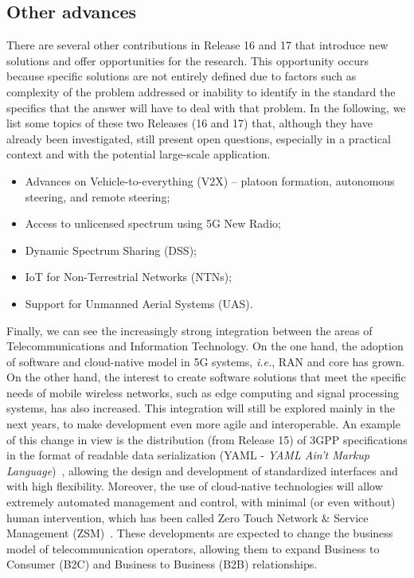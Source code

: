 \subsection*{Other advances}

There are several other contributions in Release 16 and 17 that introduce new solutions and offer opportunities for the research. This opportunity occurs because specific solutions are not entirely defined due to factors such as complexity of the problem addressed or inability to identify in the standard the specifics that the answer will have to deal with that problem. In the following, we list some topics of these two Releases (16 and 17) that, although they have already been investigated, still present open questions, especially in a practical context and with the potential large-scale application. 

\begin{itemize}
    \item Advances on Vehicle-to-everything (V2X) -- platoon formation, autonomous steering, and remote steering;
    \item Access to unlicensed spectrum using 5G New Radio; 
    \item Dynamic Spectrum Sharing (DSS);
    \item IoT for Non-Terrestrial Networks (NTNs);
    \item Support for Unmanned Aerial Systems (UAS).
\end{itemize}

Finally, we can see the increasingly strong integration between the areas of Telecommunications and Information Technology. On the one hand, the adoption of software and cloud-native model in 5G systems, \textit{i.e.}, RAN and core has grown. On the other hand, the interest to create software solutions that meet the specific needs of mobile wireless networks, such as edge computing and signal processing systems, has also increased. This integration will still be explored mainly in the next years, to make development even more agile and interoperable. An example of this change in view is the distribution (from Release 15) of 3GPP specifications in the format of readable data serialization (YAML - \textit{YAML Ain't Markup Language})~\cite{3GPP:OpenAPI}, allowing the design and development of standardized interfaces and with high flexibility. Moreover, the use of cloud-native technologies will allow extremely automated management and control, with minimal (or even without) human intervention, which has been called Zero Touch Network $\&$ Service Management (ZSM)~\cite{etsi:ZSM}. These developments are expected to change the business model of telecommunication operators, allowing them to expand Business to Consumer (B2C) and Business to Business (B2B) relationships.